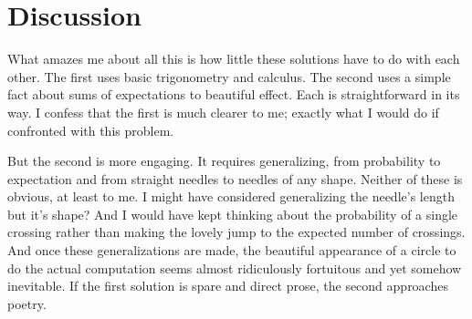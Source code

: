 \documentclass[11pt]{tufte-handout}
\begin{document}
\section{Discussion}
What amazes me about all this is how little these solutions have to do with each other. The first uses basic trigonometry and calculus. The second uses a simple fact about sums of expectations to beautiful effect. Each is straightforward in its way.  I confess that the first is much clearer to me; exactly what I would do if confronted with this problem.  

But the second is more engaging. It requires generalizing, from probability to expectation and from straight needles to needles of any shape.  Neither of these is obvious, at least to me.  I might have considered generalizing the needle's length but it's shape? And I would have kept thinking about the probability of a single crossing rather than making the lovely jump to the expected number of crossings.  And once these generalizations are made, the beautiful appearance of a circle to do the actual computation seems almost ridiculously fortuitous and yet somehow inevitable.  If the first solution is spare and direct prose, the second approaches poetry.
\end{document}
